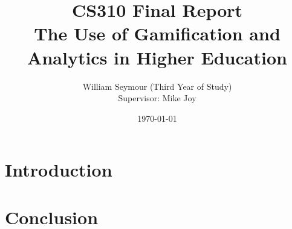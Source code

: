 \documentclass{report}
\title{CS310 Final Report \\ The Use of Gamification and Analytics in Higher Education}
\author{William Seymour (Third Year of Study) \\ Supervisor: Mike Joy}
\date{\today}
\begin{document}
\maketitle
\clearpage
\tableofcontents
\section{Introduction}	
\section{Conclusion}
\end{document}
